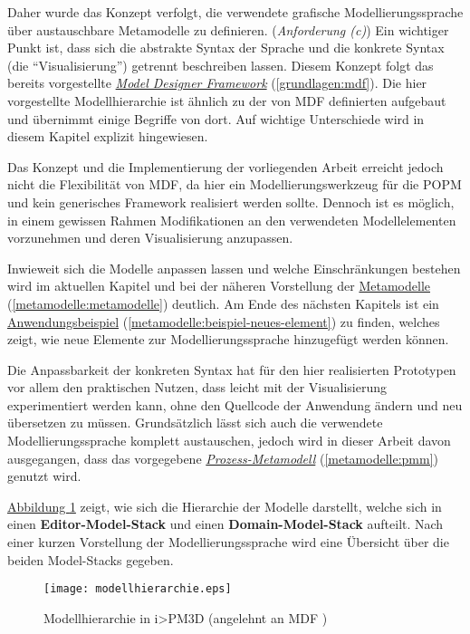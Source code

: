 \documentclass[a4paper,10pt]{sphinxmanual}
\begin{document}
Daher wurde das Konzept verfolgt, die verwendete grafische Modellierungssprache über austauschbare Metamodelle zu definieren. (\emph{Anforderung (c)})
Ein wichtiger Punkt ist, dass sich die abstrakte Syntax der Sprache und die konkrete Syntax (die "`Visualisierung"') getrennt beschreiben lassen.
Diesem Konzept folgt das bereits vorgestellte {\hyperref[grundlagen:mdf]{\emph{Model Designer Framework}}} (\autoref*{grundlagen:mdf}).
Die hier vorgestellte Modellhierarchie ist ähnlich zu der von MDF definierten aufgebaut und übernimmt einige Begriffe von dort.
Auf wichtige Unterschiede wird in diesem Kapitel explizit hingewiesen.

Das Konzept und die Implementierung der vorliegenden Arbeit erreicht jedoch nicht die Flexibilität von MDF, da hier ein Modellierungswerkzeug für die POPM und kein generisches Framework realisiert werden sollte.
Dennoch ist es möglich, in einem gewissen Rahmen Modifikationen an den verwendeten Modellelementen vorzunehmen und deren Visualisierung anzupassen.

Inwieweit sich die Modelle anpassen lassen und welche Einschränkungen bestehen wird im aktuellen Kapitel und bei der näheren Vorstellung der {\hyperref[metamodelle:metamodelle]{Metamodelle}} (\autoref*{metamodelle:metamodelle}) deutlich.
Am Ende des nächsten Kapitels ist ein {\hyperref[metamodelle:beispiel-neues-element]{Anwendungsbeispiel}} (\autoref*{metamodelle:beispiel-neues-element}) zu finden, welches zeigt, wie neue Elemente zur Modellierungssprache hinzugefügt werden können.

Die Anpassbarkeit der konkreten Syntax hat für den hier realisierten Prototypen vor allem den praktischen Nutzen, dass leicht mit der Visualisierung experimentiert werden kann, ohne den Quellcode der Anwendung ändern und neu übersetzen zu müssen.
Grundsätzlich lässt sich auch die verwendete Modellierungssprache komplett austauschen, jedoch wird in dieser Arbeit davon ausgegangen, dass das vorgegebene {\hyperref[metamodelle:pmm]{\emph{Prozess-Metamodell}}} (\autoref*{metamodelle:pmm}) genutzt wird.

\hyperref[modellhierarchie:modellhierarchie-diagram]{Abbildung  \ref*{modellhierarchie:modellhierarchie-diagram}} zeigt, wie sich die Hierarchie der Modelle darstellt, welche sich in einen \textbf{Editor-Model-Stack} und einen \textbf{Domain-Model-Stack} aufteilt.
Nach einer kurzen Vorstellung der Modellierungssprache wird eine Übersicht über die beiden Model-Stacks gegeben.
\begin{figure}[htbp]
\centering
\capstart

\texttt{[image: modellhierarchie.eps]}
\caption{Modellhierarchie in i\textgreater{}PM3D (angelehnt an MDF \cite{roth_konzeption_2011})}\label{modellhierarchie:modellhierarchie-diagram}\end{figure}
\end{document}
